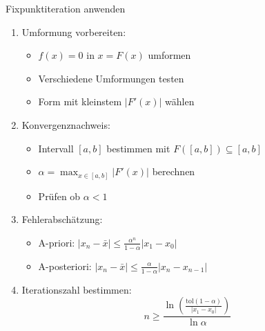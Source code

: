 \begin{KR}{Fixpunktiteration anwenden}
\begin{enumerate}
    \item Umformung vorbereiten:
    \begin{itemize}
        \item $f(x) = 0$ in $x = F(x)$ umformen
        \item Verschiedene Umformungen testen
        \item Form mit kleinstem $|F'(x)|$ wählen
    \end{itemize}
    
    \item Konvergenznachweis:
    \begin{itemize}
        \item Intervall $[a,b]$ bestimmen mit $F([a,b]) \subseteq [a,b]$
        \item $\alpha = \max_{x \in [a,b]} |F'(x)|$ berechnen
        \item Prüfen ob $\alpha < 1$
    \end{itemize}
    
    \item Fehlerabschätzung:
    \begin{itemize}
        \item A-priori: $|x_n-\bar{x}| \leq \frac{\alpha^n}{1-\alpha}|x_1-x_0|$
        \item A-posteriori: $|x_n-\bar{x}| \leq \frac{\alpha}{1-\alpha}|x_n-x_{n-1}|$
    \end{itemize}
    
    \item Iterationszahl bestimmen:
    $$n \geq \frac{\ln(\frac{\text{tol}(1-\alpha)}{|x_1-x_0|})}{\ln \alpha}$$
\end{enumerate}
\end{KR}

